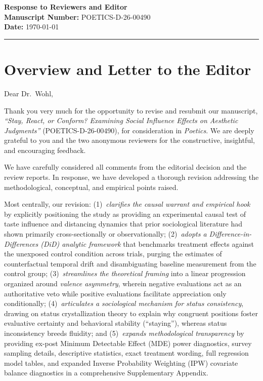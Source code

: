 \documentclass[11pt, letterpaper]{article}
\begin{document}
{\LARGE \textbf{Response to Reviewers and Editor}}\\[6pt]
\textbf{Manuscript Number:} POETICS-D-26-00490\\
\textbf{Date:} \today

\vspace{10pt}
\hrule
\vspace{15pt}

\section*{Overview and Letter to the Editor}

Dear Dr.~Wohl,

Thank you very much for the opportunity to revise and resubmit our manuscript, \textit{``Stay, React, or Conform? Examining Social Influence Effects on Aesthetic Judgments''} (POETICS-D-26-00490), for consideration in \textit{Poetics}. We are deeply grateful to you and the two anonymous reviewers for the constructive, insightful, and encouraging feedback.

We have carefully considered all comments from the editorial decision and the review reports. In response, we have developed a thorough revision addressing the methodological, conceptual, and empirical points raised.

Most centrally, our revision: (1)~\textit{clarifies the causal warrant and empirical hook} by explicitly positioning the study as providing an experimental causal test of taste influence and distancing dynamics that prior sociological literature had shown primarily cross-sectionally or observationally; (2)~\textit{adopts a Difference-in-Differences (DiD) analytic framework} that benchmarks treatment effects against the unexposed control condition across trials, purging the estimates of counterfactual temporal drift and disambiguating baseline measurement from the control group; (3)~\textit{streamlines the theoretical framing} into a linear progression organized around \textit{valence asymmetry}, wherein negative evaluations act as an authoritative veto while positive evaluations facilitate appreciation only conditionally; (4)~\textit{articulates a sociological mechanism for status consistency}, drawing on status crystallization theory to explain why congruent positions foster evaluative certainty and behavioral stability (``staying''), whereas status inconsistency breeds fluidity; and (5)~\textit{expands methodological transparency} by providing ex-post Minimum Detectable Effect (MDE) power diagnostics, survey sampling details, descriptive statistics, exact treatment wording, full regression model tables, and expanded Inverse Probability Weighting (IPW) covariate balance diagnostics in a comprehensive Supplementary Appendix.
\end{document}
